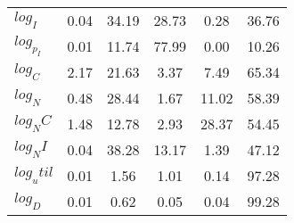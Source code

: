 \begin{center}
\begin{longtable}{lccccc}
$log_I     $	 & 	        0.04	 & 	       34.19	 & 	       28.73	 & 	        0.28	 & 	       36.76 \\ 
$log_p_I   $	 & 	        0.01	 & 	       11.74	 & 	       77.99	 & 	        0.00	 & 	       10.26 \\ 
$log_C     $	 & 	        2.17	 & 	       21.63	 & 	        3.37	 & 	        7.49	 & 	       65.34 \\ 
$log_N     $	 & 	        0.48	 & 	       28.44	 & 	        1.67	 & 	       11.02	 & 	       58.39 \\ 
$log_NC    $	 & 	        1.48	 & 	       12.78	 & 	        2.93	 & 	       28.37	 & 	       54.45 \\ 
$log_NI    $	 & 	        0.04	 & 	       38.28	 & 	       13.17	 & 	        1.39	 & 	       47.12 \\ 
$log_util  $	 & 	        0.01	 & 	        1.56	 & 	        1.01	 & 	        0.14	 & 	       97.28 \\ 
$log_D     $	 & 	        0.01	 & 	        0.62	 & 	        0.05	 & 	        0.04	 & 	       99.28 \\ 
\end{longtable}
 \end{center}
